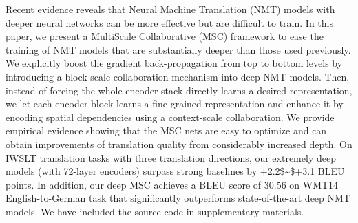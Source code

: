 Recent evidence reveals that Neural Machine Translation (NMT) models with deeper neural networks can be more effective but are difficult to train. In this paper, we present a MultiScale Collaborative (MSC) framework to ease the training of NMT models that are substantially deeper than those used previously. We explicitly boost the gradient back-propagation from top to bottom levels by introducing a block-scale collaboration mechanism into deep NMT models. Then, instead of forcing the whole encoder stack directly learns a desired representation, we let each encoder block learns a fine-grained representation and enhance it by encoding spatial dependencies using a context-scale collaboration. We provide empirical evidence showing that the MSC nets are easy to optimize and can obtain improvements of translation quality from considerably increased depth. On IWSLT translation tasks with three translation directions, our extremely deep models (with 72-layer encoders) surpass strong baselines by +2.2\$\sim\$+3.1 BLEU points. In addition, our deep MSC achieves a BLEU score of 30.56 on WMT14 English-to-German task that significantly outperforms state-of-the-art deep NMT models. We have included the source code in supplementary materials.
